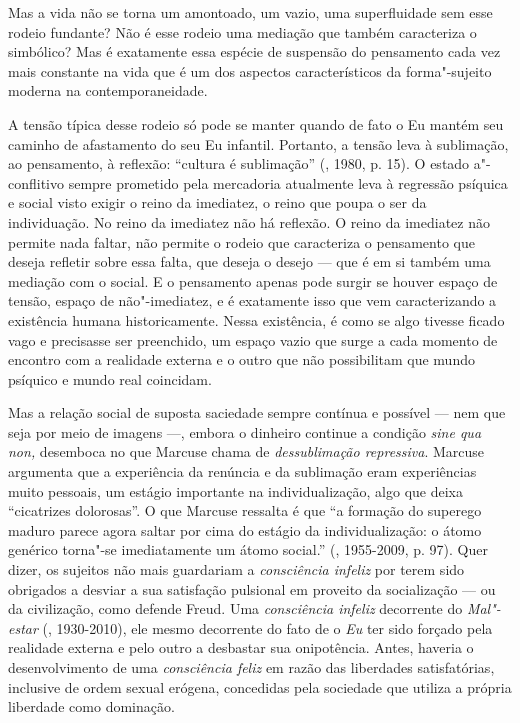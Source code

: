 {Mas a vida não se torna um amontoado, um vazio, uma superfluidade sem
esse rodeio fundante? Não é esse rodeio uma mediação que também
caracteriza o simbólico? Mas é exatamente essa espécie de suspensão do
pensamento cada vez mais constante na vida que é um dos aspectos
característicos da forma"-sujeito moderna na contemporaneidade.

A tensão típica desse rodeio só pode se manter quando de fato o Eu
mantém seu caminho de afastamento do seu Eu infantil. Portanto, a tensão
leva à sublimação, ao pensamento, à reflexão: ``cultura é sublimação''
(, 1980, p. 15). O estado a"-conflitivo sempre prometido pela
mercadoria atualmente leva à regressão psíquica e social visto exigir o
reino da imediatez, o reino que poupa o ser da individuação. No reino da
imediatez não há reflexão. O reino da imediatez não permite nada faltar,
não permite o rodeio que caracteriza o pensamento que deseja refletir
sobre essa falta, que deseja o desejo --- que é em si também uma
mediação com o social. E o pensamento apenas pode surgir se houver
espaço de tensão, espaço de não"-imediatez, e é exatamente isso que vem
caracterizando a existência humana historicamente. Nessa existência, é
como se algo tivesse ficado vago e precisasse ser preenchido, um espaço
vazio que surge a cada momento de encontro com a realidade externa e o
outro que não possibilitam que mundo psíquico e mundo real coincidam.

Mas a relação social de suposta saciedade sempre contínua e possível ---
nem que seja por meio de imagens ---, embora o dinheiro continue a
condição \emph{sine qua non,} desemboca no que Marcuse chama de
\emph{dessublimação repressiva}. Marcuse argumenta que a experiência da
renúncia e da sublimação eram experiências muito pessoais, um estágio
importante na individualização, algo que deixa ``cicatrizes dolorosas''.
O que Marcuse ressalta é que ``a formação do superego maduro parece
agora saltar por cima do estágio da individualização: o átomo genérico
torna"-se imediatamente um átomo social.'' (, 1955-2009, p. 97).
Quer dizer, os sujeitos não mais guardariam a \emph{consciência infeliz}
por terem sido obrigados a desviar a sua satisfação pulsional em
proveito da socialização --- ou da civilização, como defende Freud. Uma
\emph{consciência infeliz} decorrente do \emph{Mal"-estar} (,
1930-2010), ele mesmo decorrente do fato de o \emph{Eu} ter sido forçado
pela realidade externa e pelo outro a desbastar sua onipotência. Antes,
haveria o desenvolvimento de uma \emph{consciência feliz} em razão das
liberdades satisfatórias, inclusive de ordem sexual erógena, concedidas
pela sociedade que utiliza a própria liberdade como dominação.

}
